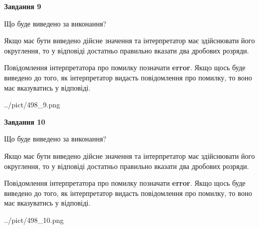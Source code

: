 \documentclass[12pt, ukrainian]{article}
\begin{document}
{\begin {Large}
{\begin {center}\textbf{Завдання 9}\end {center}}\par
Що буде виведено за виконання? \par

Якщо має бути виведено дійсне значення та інтерпретатор має здійснювати його округлення, 
то у відповіді достатньо правильно вказати два дробових розряди.

Повідомлення інтерпретатора про помилку позначати \textbf{error}.
Якщо щось буде виведено до того, як інтерпретатор видасть повідомлення про помилку, 
то воно має вказуватись у відповіді. \par

\begin{center}
	{../pict/498_9.png}
\end{center}
\newpage

{\begin {center}\textbf{Завдання 10}\end {center}}\par
Що буде виведено за виконання? \par

Якщо має бути виведено дійсне значення та інтерпретатор має здійснювати його округлення, 
то у відповіді достатньо правильно вказати два дробових розряди.

Повідомлення інтерпретатора про помилку позначати \textbf{error}.
Якщо щось буде виведено до того, як інтерпретатор видасть повідомлення про помилку, 
то воно має вказуватись у відповіді. \par

\begin{center}
	{../pict/498_10.png}
\end{center}
\newpage

\end {Large}}
\end{document}
